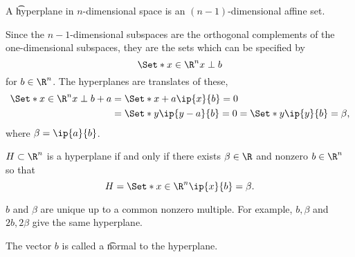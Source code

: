 


A \t{hyperplane} in $n$-dimensional space is an $(n-1)$-dimensional affine set.

Since the $n-1$-dimensional subspaces are the orthogonal complements of the one-dimensional subspaces, they are the sets which can be specified by
$$
  \Set*{x \in \R^n}{x \perp b}
$$
for $b \in \R^n$.
The hyperplanes are translates of these,
$$
  \begin{aligned}
  \Set*{x \in \R^n}{x \perp b} + a &= \Set*{x + a}{\ip{x}{b} = 0} \\
                                   &= \Set*{y}{\ip{y - a}{b} = 0} = \Set*{y}{\ip{y}{b} = \beta}, \\
  \end{aligned}
$$
where $\beta = \ip{a}{b}$.


\begin{prop}
  $H \subset \R^n$ is a hyperplane if and only if there exists $\beta \in \R$ and nonzero $b \in \R^n$ so that
  $$
    H = \Set*{x \in \R^n}{\ip{x}{b} = \beta}.
  $$
\end{prop}
\begin{remark}
  $b$ and $\beta$ are unique up to a common nonzero multiple.
  For example, $b, \beta$ and $2b, 2\beta$ give the same hyperplane.
\end{remark}
\begin{remark}
  The vector $b$ is called a \t{normal} to the hyperplane.
\end{remark}
